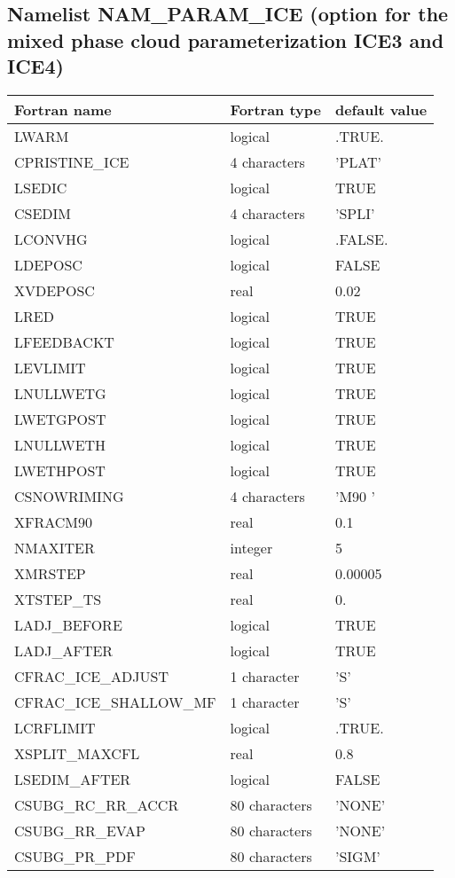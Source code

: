 \subsection{Namelist NAM\_PARAM\_ICE (option for the mixed phase cloud 
parameterization ICE3 and ICE4)}
%
\begin{longtable} {|p{}|p{}|p{}|}
\hline
Fortran name &  Fortran type & default value \\
\hline 
\endhead
\hline
\endfoot
LWARM         &  logical     & .TRUE. \\
CPRISTINE\_ICE & 4 characters & 'PLAT' \\
LSEDIC & logical & TRUE \\
CSEDIM & 4 characters & 'SPLI' \\
LCONVHG       &  logical     & .FALSE. \\
LDEPOSC& logical & FALSE \\
XVDEPOSC& real & 0.02 \\
LRED & logical & TRUE \\
LFEEDBACKT & logical & TRUE \\
LEVLIMIT & logical & TRUE \\
LNULLWETG & logical & TRUE \\
LWETGPOST & logical & TRUE \\
 LNULLWETH & logical & TRUE \\
LWETHPOST & logical & TRUE \\
CSNOWRIMING & 4 characters & 'M90 ' \\
XFRACM90 & real & 0.1 \\
NMAXITER & integer & 5 \\
XMRSTEP & real & 0.00005 \\
XTSTEP\_TS & real & 0. \\
LADJ\_BEFORE & logical & TRUE \\
LADJ\_AFTER & logical & TRUE \\
CFRAC\_ICE\_ADJUST  & 1 character & 'S' \\
CFRAC\_ICE\_SHALLOW\_MF& 1 character & 'S' \\
LCRFLIMIT &  logical     & .TRUE. \\
XSPLIT\_MAXCFL& real & 0.8 \\
LSEDIM\_AFTER & logical & FALSE \\
CSUBG\_RC\_RR\_ACCR & 80 characters & 'NONE' \\
CSUBG\_RR\_EVAP & 80 characters & 'NONE' \\
CSUBG\_PR\_PDF & 80 characters & 'SIGM' \\
\end{longtable}

